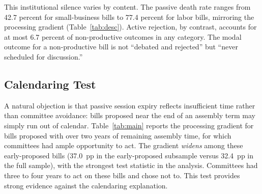\documentclass[11pt]{article}
\begin{document}
This institutional silence varies by content. The passive death rate ranges from 42.7 percent for small-business bills to 77.4 percent for labor bills, mirroring the processing gradient (Table~\ref{tab:desc}). Active rejection, by contrast, accounts for at most 6.7 percent of non-productive outcomes in any category. The modal outcome for a non-productive bill is not ``debated and rejected'' but ``never scheduled for discussion.''

\subsection{Calendaring Test}

A natural objection is that passive session expiry reflects insufficient time rather than committee avoidance: bills proposed near the end of an assembly term may simply run out of calendar. Table~\ref{tab:main} reports the processing gradient for bills proposed with over two years of remaining assembly time, for which committees had ample opportunity to act. The gradient \textit{widens} among these early-proposed bills (37.0~pp in the early-proposed subsample versus 32.4~pp in the full sample), with the strongest test statistic in the analysis. Committees had three to four years to act on these bills and chose not to. This test provides strong evidence against the calendaring explanation.
\end{document}
